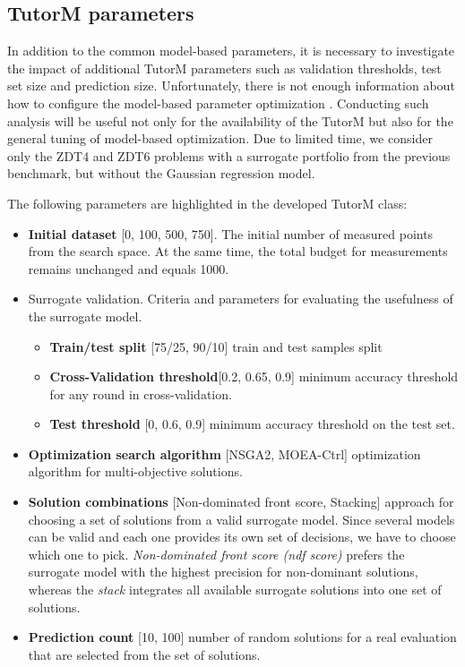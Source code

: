     \subsection{TutorM parameters}
    In addition to the common model-based parameters, it is necessary to investigate the impact of additional TutorM parameters such as validation thresholds, test set size and prediction size. Unfortunately, there is not enough information about how to configure the model-based parameter optimization  \cite{}. Conducting such analysis will be useful not only for the availability of the TutorM but also for the general tuning of model-based optimization. 
    Due to limited time, we consider only the ZDT4 and ZDT6 problems with a surrogate portfolio from the previous benchmark, but without the Gaussian regression model. 


    The following parameters are highlighted in the developed TutorM class:
    \begin{itemize}
        \item \textbf{Initial dataset} [0, 100, 500, 750]. The initial number of measured points from the search space. At the same time, the total budget for measurements remains unchanged and equals 1000.
        \item Surrogate validation. Criteria and parameters for evaluating the usefulness of the surrogate model.
            \begin{itemize}
                \item \textbf{Train/test split} [75/25, 90/10] train and test samples split
                \item \textbf{Cross-Validation threshold}[0.2, 0.65, 0.9] minimum accuracy threshold for any round in cross-validation.
                \item \textbf{Test threshold} [0, 0.6, 0.9] minimum accuracy threshold on the test set.
            \end{itemize}
        \item \textbf{Optimization search algorithm} [NSGA2, MOEA-Ctrl] optimization algorithm for multi-objective solutions. 
        \item \textbf{Solution combinations} [Non-dominated front score, Stacking] approach for choosing a set of solutions from a valid surrogate model. Since several models can be valid and each one provides its own set of decisions, we have to choose which one to pick. \emph{Non-dominated front score (ndf score)} prefers the surrogate model with the highest precision for non-dominant solutions, whereas the \emph{stack} integrates all available surrogate solutions into one set of solutions. 
        \item \textbf{Prediction count} [10, 100] number of random solutions for a real evaluation that are selected from the set of solutions.
    \end{itemize}

